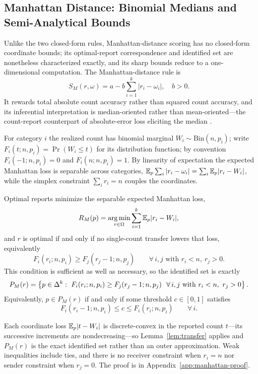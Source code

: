 \subsection{Manhattan Distance: Binomial Medians and Semi-Analytical Bounds}

Unlike the two closed-form rules, Manhattan-distance scoring has no closed-form coordinate bounds; its optimal-report correspondence and identified set are nonetheless characterized exactly, and its sharp bounds reduce to a one-dimensional computation.
The Manhattan-distance rule is
\[
S_M(r,\omega)=a-b\sum_{i=1}^k |r_i-\omega_i|,
\quad b>0.
\]
It rewards total absolute count accuracy rather than squared count accuracy, and its inferential interpretation is median-oriented rather than mean-oriented---the count-report counterpart of absolute-error loss eliciting the median \citep{Gneiting2011}.

For category \(i\) the realized count has binomial marginal \(W_i\sim\mathrm{Bin}(n,p_i)\); write \(F_i(t;n,p_i)=\Pr(W_i\le t)\) for its distribution function; by convention \(F_i(-1;n,p_i)=0\) and \(F_i(n;n,p_i)=1\).
By linearity of expectation the expected Manhattan loss is separable across categories, \(\mathbb{E}_p\sum_i|r_i-\omega_i|=\sum_i\mathbb{E}_p|r_i-W_i|\), while the simplex constraint \(\sum_i r_i=n\) couples the coordinates.

\begin{proposition}\label{prop:manhattan}
Optimal reports minimize the separable expected Manhattan loss,
\[
R_M(p)=\operatorname*{arg\,min}_{r\in\Omega}\sum_{i=1}^k\mathbb{E}_p|r_i-W_i|,
\]
and \(r\) is optimal if and only if no single-count transfer lowers that loss, equivalently
\[
F_i(r_i;n,p_i)\ge F_j(r_j-1;n,p_j)
\qquad\forall\,i,j\text{ with }r_i<n,\ r_j>0.
\]
This condition is sufficient as well as necessary, so the identified set is exactly
\[
P_M(r)=\left\{p\in\DeltaK:\ F_i(r_i;n,p_i)\ge F_j(r_j-1;n,p_j)\ \ \forall\,i,j\text{ with }r_i<n,\ r_j>0\right\}.
\]
Equivalently, \(p\in P_M(r)\) if and only if some threshold \(c\in[0,1]\) satisfies
\[
F_i(r_i-1;n,p_i)\le c\le F_i(r_i;n,p_i)\qquad\forall\,i.
\]
\end{proposition}

Each coordinate loss \(\mathbb{E}_p|t-W_i|\) is discrete-convex in the reported count \(t\)---its successive increments are nondecreasing---so Lemma~\ref{lem:transfer} applies and \(P_M(r)\) is the exact identified set rather than an outer approximation.
Weak inequalities include ties, and there is no receiver constraint when \(r_i=n\) nor sender constraint when \(r_j=0\).
The proof is in Appendix~\ref{app:manhattan-proof}.

